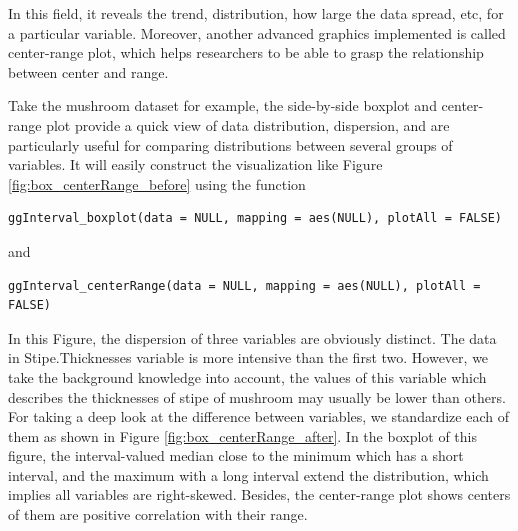 \documentclass[article]{jss}
\begin{document}
In this field, it reveals the trend, distribution, how large the data spread, etc, for a particular variable. Moreover, another advanced graphics implemented is called center-range plot, which helps researchers to be able to grasp the relationship between center and range. 

Take the mushroom dataset for example, the side-by-side boxplot and center-range plot provide a quick view of data distribution, dispersion, and are particularly useful for comparing distributions between several groups of variables. It will easily construct the visualization like Figure \ref{fig:box_centerRange_before} using the function 

\begin{verbatim}
ggInterval_boxplot(data = NULL, mapping = aes(NULL), plotAll = FALSE)
\end{verbatim}

and 

\begin{verbatim}
ggInterval_centerRange(data = NULL, mapping = aes(NULL), plotAll = FALSE)
\end{verbatim}

In this Figure, the dispersion of three variables are obviously distinct. The data in Stipe.Thicknesses variable is more intensive than the first two. However, we take the background knowledge into account, the values of this variable which describes the thicknesses of stipe of mushroom may usually be lower than others. For taking a deep look at the difference between variables, we standardize each of them as shown in Figure \ref{fig:box_centerRange_after}. In the boxplot of this figure, the interval-valued median close to the minimum which has a short interval, and the maximum with a long interval extend the distribution, which implies all variables are right-skewed. Besides, the center-range plot shows centers of them are positive correlation with their range. 
\end{document}
